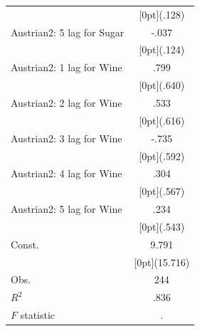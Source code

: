 \documentclass[12pt,a4paper,titlepage]{article}
\begin{document}
{\begin{tabular*}{\textwidth}{@{\extracolsep{\fill}}lc}
&	\raisebox{.7ex}[0pt]{\scriptsize (.128)} \\
Austrian2: 5 lag for Sugar &	-.037 \\
&	\raisebox{.7ex}[0pt]{\scriptsize (.124)} \\
Austrian2: 1 lag for Wine &	.799 \\
&	\raisebox{.7ex}[0pt]{\scriptsize (.640)} \\
Austrian2: 2 lag for Wine &	.533 \\
&	\raisebox{.7ex}[0pt]{\scriptsize (.616)} \\
Austrian2: 3 lag for Wine &	-.735 \\
&	\raisebox{.7ex}[0pt]{\scriptsize (.592)} \\
Austrian2: 4 lag for Wine &	.304 \\
&	\raisebox{.7ex}[0pt]{\scriptsize (.567)} \\
Austrian2: 5 lag for Wine &	.234 \\
&	\raisebox{.7ex}[0pt]{\scriptsize (.543)} \\
Const. &	9.791 \\
&	\raisebox{.7ex}[0pt]{\scriptsize (15.716)} \\
Obs. &	244 \\
$ R^2$ &	.836 \\
$ F$ statistic &	. \\
\hline\hline	
\end{tabular*}%


}
\end{document}
